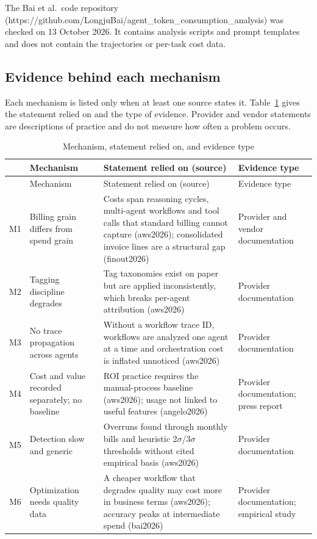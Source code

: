 \documentclass[10pt]{article}
\begin{document}
The Bai et al.\ code repository (https://github.com/LongjuBai/agent\_token\_consumption\_analysis) was checked on 13 October 2026. It contains analysis scripts and prompt templates and does not contain the trajectories or per-task cost data.

\subsection{Evidence behind each mechanism}
Each mechanism is listed only when at least one source states it. Table~\ref{tab:mech} gives the statement relied on and the type of evidence. Provider and vendor statements are descriptions of practice and do not measure how often a problem occurs.

\begin{longtable}{p{0.8cm}p{3.6cm}p{6.4cm}p{3.2cm}}
\caption{Mechanism, statement relied on, and evidence type}\label{tab:mech}\\
\toprule
 & Mechanism & Statement relied on (source) & Evidence type \\
\midrule
\endfirsthead
\toprule
 & Mechanism & Statement relied on (source) & Evidence type \\
\midrule
\endhead
M1 & Billing grain differs from spend grain & Costs span reasoning cycles, multi-agent workflows and tool calls that standard billing cannot capture (aws2026); consolidated invoice lines are a structural gap (finout2026) & Provider and vendor documentation \\
M2 & Tagging discipline degrades & Tag taxonomies exist on paper but are applied inconsistently, which breaks per-agent attribution (aws2026) & Provider documentation \\
M3 & No trace propagation across agents & Without a workflow trace ID, workflows are analyzed one agent at a time and orchestration cost is inflated unnoticed (aws2026) & Provider documentation \\
M4 & Cost and value recorded separately; no baseline & ROI practice requires the manual-process baseline (aws2026); usage not linked to useful features (angelo2026) & Provider documentation; press report \\
M5 & Detection slow and generic & Overruns found through monthly bills and heuristic 2$\sigma$/3$\sigma$ thresholds without cited empirical basis (aws2026) & Provider documentation \\
M6 & Optimization needs quality data & A cheaper workflow that degrades quality may cost more in business terms (aws2026); accuracy peaks at intermediate spend (bai2026) & Provider documentation; empirical study \\

\end{longtable}
\end{document}
